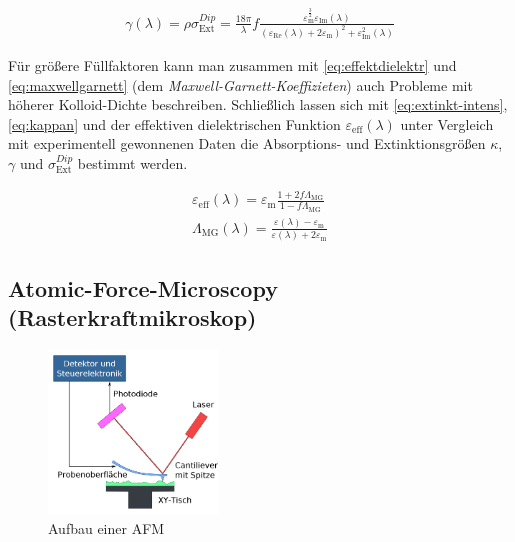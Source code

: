 \documentclass[numbers=noenddot,a4paper,notitlepage,twoside,BCOR15mm]{scrartcl}
\newcommand{\ix}[1]{_\text{#1}}
\newcommand{\tilt}[1]{\textit{#1}}
\begin{document}
				\begin{align}
					\gamma\left(\lambda\right)=\rho\sigma\ix{Ext}^{Dip}=\frac{18\pi}{\lambda}f\frac{\varepsilon\ix{m}^{\frac{3}{2}}\varepsilon\ix{Im}\left(\lambda\right)}{\left(\varepsilon\ix{Re}\left(\lambda\right)+2\varepsilon\ix{m}\right)^2+\varepsilon\ix{Im}^{2}\left(\lambda\right)}
				\end{align}

			Für größere Füllfaktoren kann man zusammen mit \autoref{eq:effektdielektr} und \autoref{eq:maxwellgarnett} (dem \tilt{Maxwell-Garnett-Koeffizieten}) auch Probleme mit höherer Kolloid-Dichte beschreiben. Schließlich lassen sich mit \autoref{eq:extinkt-intens}, \autoref{eq:kappan} und der effektiven dielektrischen Funktion $\varepsilon\ix{eff}\left(\lambda\right)$ unter Vergleich mit experimentell gewonnenen Daten die Absorptions- und Extinktionsgrößen $\kappa$, $\gamma$ und $\sigma\ix{Ext}^{Dip}$ bestimmt werden.

				\begin{align}
					\varepsilon\ix{eff}\left(\lambda\right)=\varepsilon\ix{m}\frac{1+2f\Lambda\ix{MG}}{1-f\Lambda\ix{MG}} \label{eq:effektdielektr}\\
					\Lambda\ix{MG}\left(\lambda\right)=\frac{\varepsilon\left(\lambda\right)-\varepsilon\ix{m}}{\varepsilon\left(\lambda\right)+2\varepsilon\ix{m}} \label{eq:maxwellgarnett}
				\end{align}


		\subsection{Atomic-Force-Microscopy (Rasterkraftmikroskop)}\label{subsec:afm}

				\begin{figure}
					\centering
					\includegraphics[width=0.4\textwidth]{Atomic_force_microscope_block_diagram_(de).png}
					\caption{Aufbau einer AFM \cite{Wiki:AFM}}
				\end{figure}
\end{document}
